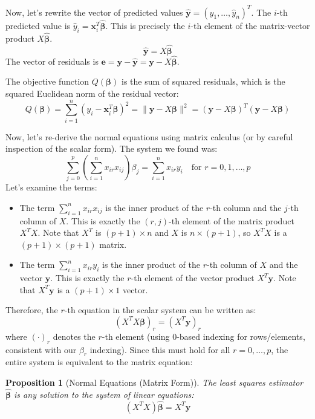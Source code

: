 \documentclass[11pt]{article}
\newtheorem{proposition}[theorem]{Proposition}
\theoremstyle{definition}
\newcommand{\T}{^T} %
\newcommand{\norm}[1]{\|#1\|}
\begin{document}
Now, let's rewrite the vector of predicted values $\hat{\mathbf{y}} = (\hat{y}_1, \dots, \hat{y}_n)\T$. The $i$-th predicted value is $\hat{y}_i = \mathbf{x}_i\T \hat{\boldsymbol{\beta}}$. This is precisely the $i$-th element of the matrix-vector product $X\hat{\boldsymbol{\beta}}$.
\[ \hat{\mathbf{y}} = X\hat{\boldsymbol{\beta}} \]
The vector of residuals is $\mathbf{e} = \mathbf{y} - \hat{\mathbf{y}} = \mathbf{y} - X\hat{\boldsymbol{\beta}}$.

The objective function $Q(\boldsymbol{\beta})$ is the sum of squared residuals, which is the squared Euclidean norm of the residual vector:
\[ Q(\boldsymbol{\beta}) = \sum_{i=1}^{n} (y_i - \mathbf{x}_i\T \boldsymbol{\beta})^2 = \norm{\mathbf{y} - X\boldsymbol{\beta}}^2 = (\mathbf{y} - X\boldsymbol{\beta})\T (\mathbf{y} - X\boldsymbol{\beta}) \]

Now, let's re-derive the normal equations using matrix calculus (or by careful inspection of the scalar form). The system we found was:
\[ \sum_{j=0}^{p} \left( \sum_{i=1}^{n} x_{ir} x_{ij} \right) \beta_j = \sum_{i=1}^{n} x_{ir} y_i \quad \text{for } r = 0, 1, \dots, p \]
Let's examine the terms:
\begin{itemize}
    \item The term $\sum_{i=1}^{n} x_{ir} x_{ij}$ is the inner product of the $r$-th column and the $j$-th column of $X$. This is exactly the $(r, j)$-th element of the matrix product $X\T X$. Note that $X\T$ is $(p+1) \times n$ and $X$ is $n \times (p+1)$, so $X\T X$ is a $(p+1) \times (p+1)$ matrix.
    \item The term $\sum_{i=1}^{n} x_{ir} y_i$ is the inner product of the $r$-th column of $X$ and the vector $\mathbf{y}$. This is exactly the $r$-th element of the vector product $X\T \mathbf{y}$. Note that $X\T \mathbf{y}$ is a $(p+1) \times 1$ vector.
\end{itemize}
Therefore, the $r$-th equation in the scalar system can be written as:
\[ (X\T X \boldsymbol{\beta})_r = (X\T \mathbf{y})_r \]
where $(\cdot)_r$ denotes the $r$-th element (using 0-based indexing for rows/elements, consistent with our $\beta_r$ indexing). Since this must hold for all $r = 0, \dots, p$, the entire system is equivalent to the matrix equation:

\begin{proposition}[Normal Equations (Matrix Form)]
The least squares estimator $\hat{\boldsymbol{\beta}}$ is any solution to the system of linear equations:
\[ (X\T X) \hat{\boldsymbol{\beta}} = X\T \mathbf{y} \]
\end{proposition}
\end{document}

